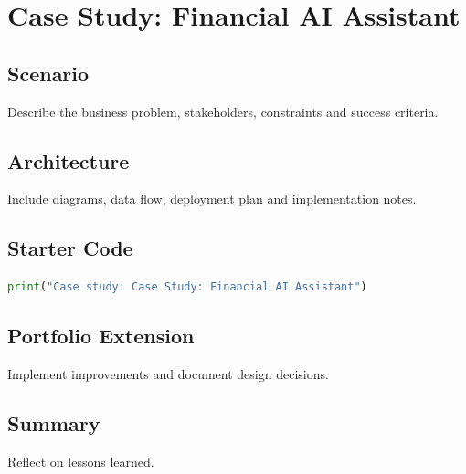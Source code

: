 \chapter{Case Study: Financial AI Assistant}
\label{chap:vol14-5}



\section{Scenario}
Describe the business problem, stakeholders, constraints and success criteria.

\section{Architecture}
Include diagrams, data flow, deployment plan and implementation notes.

\section{Starter Code}
\begin{lstlisting}[language=Python]
print("Case study: Case Study: Financial AI Assistant")
\end{lstlisting}

\section{Portfolio Extension}
Implement improvements and document design decisions.

\section{Summary}
Reflect on lessons learned.
